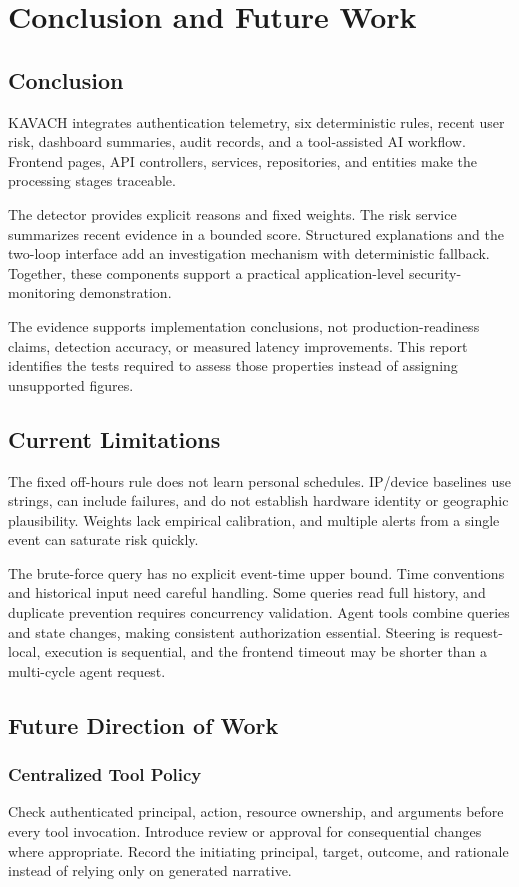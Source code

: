 \chapter{Conclusion and Future Work}
\section{Conclusion}
KAVACH integrates authentication telemetry, six deterministic rules, recent user risk, dashboard summaries, audit records, and a tool-assisted AI workflow. Frontend pages, API controllers, services, repositories, and entities make the processing stages traceable.

The detector provides explicit reasons and fixed weights. The risk service summarizes recent evidence in a bounded score. Structured explanations and the two-loop interface add an investigation mechanism with deterministic fallback. Together, these components support a practical application-level security-monitoring demonstration.

The evidence supports implementation conclusions, not production-readiness claims, detection accuracy, or measured latency improvements. This report identifies the tests required to assess those properties instead of assigning unsupported figures.

\section{Current Limitations}
The fixed off-hours rule does not learn personal schedules. IP/device baselines use strings, can include failures, and do not establish hardware identity or geographic plausibility. Weights lack empirical calibration, and multiple alerts from a single event can saturate risk quickly.

The brute-force query has no explicit event-time upper bound. Time conventions and historical input need careful handling. Some queries read full history, and duplicate prevention requires concurrency validation. Agent tools combine queries and state changes, making consistent authorization essential. Steering is request-local, execution is sequential, and the frontend timeout may be shorter than a multi-cycle agent request.

\section{Future Direction of Work}
\subsection{Centralized Tool Policy}
Check authenticated principal, action, resource ownership, and arguments before every tool invocation. Introduce review or approval for consequential changes where appropriate. Record the initiating principal, target, outcome, and rationale instead of relying only on generated narrative.

